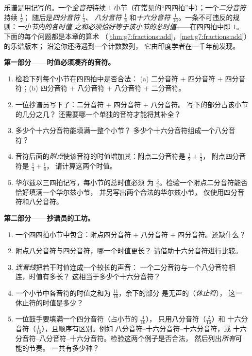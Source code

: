 \begin{problem}
\label{pb:g7:fractions:1}
乐谱是用记写的。一个\emph{全音符}持续 $1$
小节（在常见的“四四拍”中）；一个\emph{二分音符}持续 $\frac12$；
随后是\emph{四分音符} $\frac14$、
\emph{八分音符} $\frac18$ 和\emph{十六分音符}
$\frac{1}{16}$。一条不可违反的规则：\emph{一小节内的各时值
之和必须恰好等于该小节的总时值}——在四四拍中即 $1$。
下面的每个问题都是本章的算术
（\cref{thm:g7:fractions:add}，\cref{met:g7:fractions:add}）的乐谱版本；
沿途你还将遇到一个计数数列，
它由印度学者在一千年前发现。

\medskip
\noindent\textbf{第一部分——时值必须凑齐的音符。}
\begin{enumerate}
  \item 检验下列每个小节在四四拍中是否合法：
        (a) 二分音符 $+$ 四分音符 $+$ 四分音符；(b) 四分音符 $+$
        八分音符 $+$ 八分音符 $+$ 二分音符。
  \item 一位抄谱员写下了：二分音符 $+$ 四分音符 $+$ 八分音符。
        写下的部分占该小节的几分之几？
        还需要哪一个单独的音符才能将其补全？
  \item 多少个十六分音符能填满一整个小节？
        多少个十六分音符组成一个八分音符？
  \item 音符后面的\emph{附点}使该音符的时值增加其：附点二分音符是 $\frac12 + \frac14$，
        附点四分音符是 $\frac14 + \frac18$，
        请计算这两个时值。
  \item 华尔兹以三四拍记写，每小节的总时值必须
        为 $\frac34$。检验一个附点二分音符能否恰好填满一个华尔兹小节，
        并另写出两个合法的华尔兹小节，
        仅使用四分音符和八分音符。
\end{enumerate}

\medskip
\noindent\textbf{第二部分——抄谱员的工坊。}
\begin{enumerate}[resume]
  \item 一个四四拍小节中包含：附点四分音符 $+$ 八分音符
        $+$ 四分音符。还缺什么？
  \item 附点八分音符与四分音符，哪一个时值更长？
        请借助十六分音符进行比较。
  \item \emph{连音线}把若干时值连成一个较长的声音：
        一个二分音符与一个八分音符相连，时值有多长？
        这相当于多少个十六分音符？
  \item 一个小节中各音符的时值之和为 $\frac{11}{16}$，余下的部分
        是无声的（\emph{休止符}），
        这一休止符的时值是多少？
  \item 一位鼓手要填满一个四分音符（占小节的 $\frac{4}{16}$），
        只用八分音符（$\frac{2}{16}$）和
        十六分音符（$\frac{1}{16}$），且顺序有区别。例如
        八分音符--十六分音符--十六分音符，或
        十六分音符--八分音符--十六分音符。检验这两个例子是否合法，
        然后列出\emph{所有}可能的节奏。
        一共有多少种？
\end{enumerate}


\end{problem}
